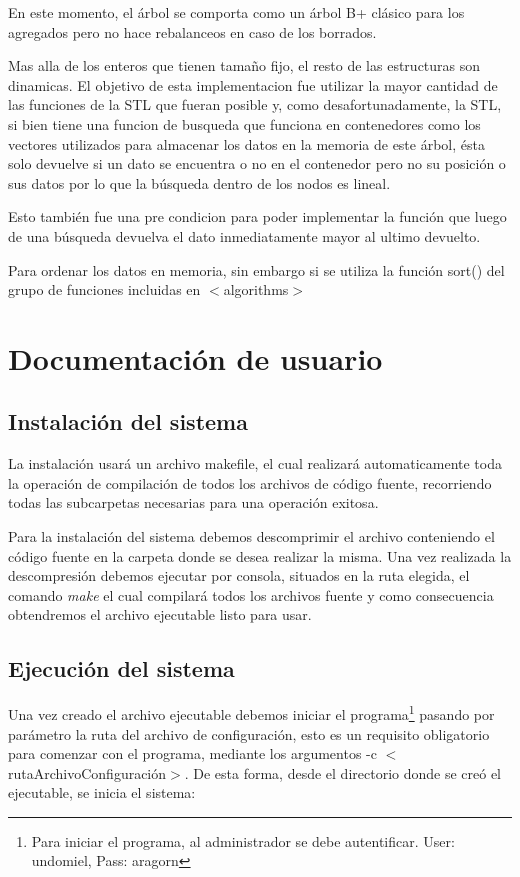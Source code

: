 \documentclass[a4paper,10pt]{article}
\begin{document}
En este momento, el árbol se comporta como un árbol B+ clásico para los agregados pero no hace rebalanceos en caso de los borrados.

Mas alla de los enteros que tienen tamaño fijo, el resto de las estructuras son dinamicas. El objetivo de esta implementacion fue utilizar la mayor cantidad de las funciones de la STL que fueran posible y, como desafortunadamente, la STL, si bien tiene una funcion de busqueda que funciona en contenedores como los vectores utilizados para almacenar los datos en la memoria de este árbol, ésta solo devuelve si un dato se encuentra o no en el contenedor pero no su posición o sus datos por lo que la búsqueda dentro de los nodos es lineal.

Esto también fue una pre condicion para poder implementar la función que luego de una búsqueda devuelva el dato inmediatamente mayor al ultimo devuelto.

Para ordenar los datos en memoria, sin embargo si se utiliza la función sort() del grupo de funciones incluidas en $<$algorithms$>$

\section{Documentación de usuario}

\subsection{Instalación del sistema}

La instalación usará un archivo makefile, el cual realizará automaticamente toda la operación de compilación de todos los archivos de código fuente, recorriendo todas las subcarpetas necesarias para una operación exitosa.

Para la instalación del sistema debemos descomprimir el archivo conteniendo el código fuente en la carpeta donde se desea realizar la misma. Una vez realizada la descompresión debemos ejecutar por consola, situados en la ruta elegida, el comando \textit{make} el cual compilará todos los archivos fuente y como consecuencia obtendremos el archivo ejecutable listo para usar.

\subsection{Ejecución del sistema}

    Una vez creado el archivo ejecutable debemos iniciar el programa\footnote{Para iniciar el programa, al administrador se debe autentificar. User: undomiel, Pass: aragorn} pasando por parámetro la ruta del archivo de configuración, esto es un requisito obligatorio para comenzar con el programa, mediante los argumentos -c  $<$rutaArchivoConfiguración$>$. De esta forma, desde el directorio donde se creó el ejecutable, se inicia el sistema:
\end{document}
